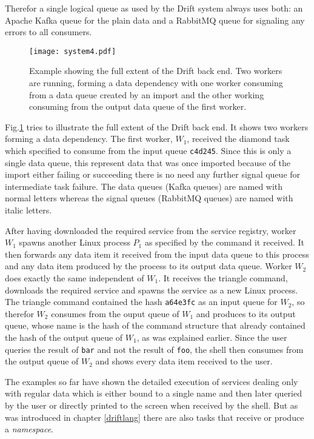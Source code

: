 Therefor a single logical queue as used by the Drift
system always uses both: an Apache Kafka queue for the plain
data and a RabbitMQ queue for signaling any errors to all
consumers.

\begin{figure}[h]
  \texttt{[image: system4.pdf]}
  \caption{Example showing the full extent of the Drift back end.
           Two workers are running, forming a data dependency with
           one worker consuming from a data queue created by an import
           and the other working consuming from the output data queue
           of the first worker.}
  \label{system4}
\end{figure}

Fig.\ref{system4} tries to illustrate the full extent of the
Drift back end. It shows two workers forming a data dependency.
The first worker, $W_{1}$, received the diamond task which specified
to consume from the input queue \texttt{c4d245}. Since this is only
a single data queue, this represent data that was once imported
because of the import either failing or succeeding there is no need
any further signal queue for intermediate task failure. The data queues
(Kafka queues) are named with normal letters whereas the signal
queues (RabbitMQ queues) are named with italic letters.

After having downloaded the required service from the service registry,
worker $W_{1}$ spawns another Linux process $P_{1}$
as specified by the command it received. It then forwards any data
item it received from the input data queue to this process and
any data item produced by the process to its output data queue.
Worker $W_{2}$ does exactly the same independent of $W_{1}$.
It receives the triangle command, downloads the required service and
spawns the service as a new Linux process. The triangle command
contained the hash \texttt{a64e3fc} as an input queue for
$W_{2}$, so therefor $W_{2}$ consumes from the ouput queue of $W_{1}$
and produces to its output queue, whose name is the hash of the
command structure that already contained the hash of the output queue
of $W_{1}$, as was explained earlier. Since the user queries the
result of \texttt{bar} and not the result of \texttt{foo}, the shell
then consumes from the output queue of $W_{2}$ and shows every data
item received to the user.
\newline

The examples so far have shown the detailed execution of services
dealing only with regular data which is either bound to
a single name and then later queried by the user or directly
printed to the screen when received by the shell. But as was
introduced in chapter \ref{driftlang} there are also tasks that
receive or produce a \textit{namespace}.

